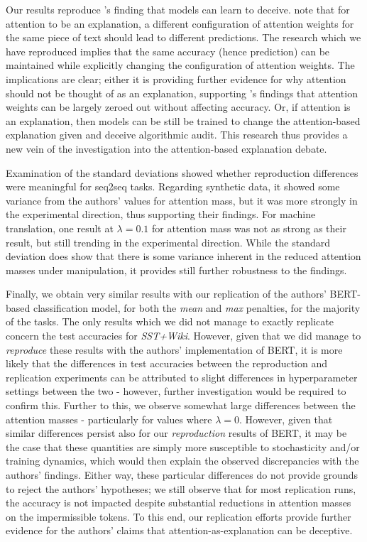 Our results reproduce \citet{pruthi-etal-2020-learning}'s finding that models can learn to deceive.
\cite{jain2019attention} note that for attention to be an explanation, a different configuration of attention weights for the same piece of text should lead to different predictions. The research which we have reproduced implies that the same accuracy (hence prediction) can be maintained while explicitly changing the configuration of attention weights. The implications are clear; either it is providing further evidence for why attention should not be thought of as an explanation, supporting \citet{serrano2019attention}'s findings that attention weights can be largely zeroed out without affecting accuracy. Or, if attention is an explanation, then models can be still be trained to change the attention-based explanation given and deceive algorithmic audit. This research thus provides a new vein of the investigation into the attention-based explanation debate.

Examination of the standard deviations showed whether reproduction differences were meaningful for seq2seq tasks. Regarding synthetic data, it showed some variance from the authors' values for attention mass, but it was more strongly in the experimental direction, thus supporting their findings. For machine translation, one result at $\lambda = 0.1$ for attention mass was not as strong as their result, but still trending in the experimental direction. While the standard deviation does show that there is some variance inherent in the reduced attention masses under manipulation, it provides still further robustness to the findings.

Finally, we obtain very similar results with our replication of the authors' BERT-based classification model, for both the \textit{mean} and \textit{max} penalties, for the majority of the tasks. The only results which we did not manage to exactly replicate concern the test accuracies for \textit{SST+Wiki}. However, given that we did manage to \textit{reproduce} these results with the authors' implementation of BERT, it is more likely that the differences in test accuracies between the reproduction and replication experiments can be attributed to slight differences in hyperparameter settings between the two - however, further investigation would be required to confirm this. Further to this, we observe somewhat large differences between the attention masses - particularly for values where $\lambda = 0$. However, given that similar differences persist also for our \textit{reproduction} results of BERT, it may be the case that these quantities are simply more susceptible to stochasticity and/or training dynamics, which would then explain the observed discrepancies with the authors' findings. Either way, these particular differences do not provide grounds to reject the authors' hypotheses; we still observe that for most replication runs, the accuracy is not impacted despite substantial reductions in attention masses on the impermissible tokens. To this end, our replication efforts provide further evidence for the authors' claims that attention-as-explanation can be deceptive.

